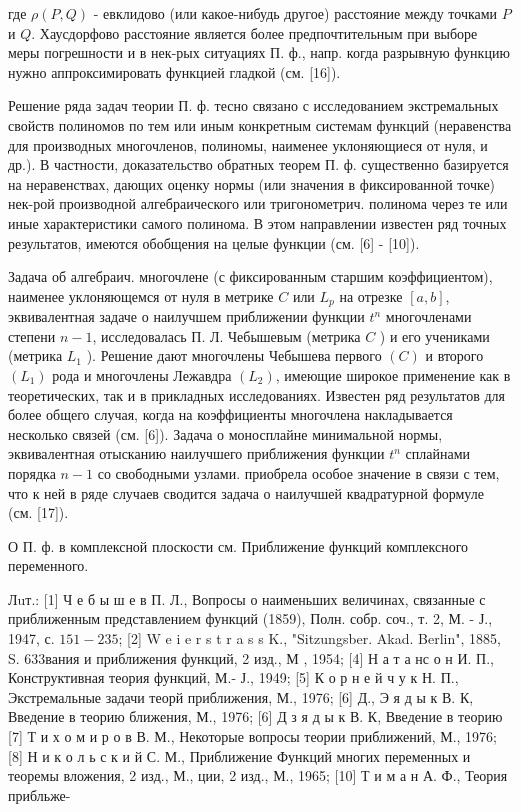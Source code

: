 \documentclass[10pt]{article}
\begin{document}
где $\rho(P, Q)$ - евклидово (или какое-нибудь другое) расстояние между точками $P$ и $Q$. Хаусдорфово расстояние является более предпочтительным при выборе меры погрешности и в нек-рых ситуациях П. ф., напр. когда разрывную функцию нужно аппроксимировать функцией гладкой (см. [16]).



Решение ряда задач теории П. ф. тесно связано с исследованием экстремальных свойств полиномов по тем или иным конкретным системам функций (неравенства для производных многочленов, полиномы, наименее уклоняющиеся от нуля, и др.). В частности, доказательство обратных теорем П. ф. существенно базируется на неравенствах, дающих оценку нормы (или значения в фиксированной точке) нек-рой производной алгебраического или тригонометрич. полинома через те или иные характеристики самого полинома. В этом направлении известен ряд точных результатов, имеются обобщения на целые функции (см. [6] - [10]).



Задача об алгебраич. многочлене (с фиксированным старшим коэффициентом), наименее уклоняющемся от нуля в метрике $C$ или $L_{p}$ на отрезке $[a, b]$, эквивалентная задаче о наилучшем приближении функции $t^{n}$ многочленами степени $n-1$, исследовалась П. Л. Чебышевым (метрика $C$ ) и его учениками (метрика $L_{1}$ ). Решение дают многочлены Чебышева первого $(C)$ и второго $\left(L_{1}\right)$ рода и многочлены Лежавдра $\left(L_{2}\right)$, имеющие широкое применение как в теоретических, так и в прикладных исследованиях. Известен ряд результатов для более общего случая, когда на коэффициенты многочлена накладывается несколько связей (см. [6]). Задача о моносплайне минимальной нормы, эквивалентная отысканию наилучшего приближения функции $t^{n}$ сплайнами порядка $n-1$ со свободными узлами. приобрела особое значение в связи с тем, что к ней в ряде случаев сводится задача о наилучшей квадратурной формуле (см. [17]).



О П. ф. в комплексной плоскости см. Приближение функций комплексного переменного.



Лuт.: [1] Ч е б ы ш е в П. Л., Вопросы о наименьших величинах, связанные с приближенным представлением функций (1859), Полн. собр. соч., т. 2, М. - Ј., 1947, с. $151-235$; [2] W e i e r s t r a s s K., "Sitzungsber. Akad. Berlin", 1885, S. 633вания и приближения функций, 2 изд., М , 1954; [4] Н а т а нс о н И. П., Конструктивная теория функций, М.- Ј., 1949; [5] К о р н е й ч у к Н. П., Экстремальные задачи теорй приближения, М., 1976; [6] Д., Э я д ы к В. К, Введение в теорию ближения, М., 1976; [6] Д з я д ы к В. К, Введение в теорию [7] Т и х о м и р о в В. М., Некоторые вопросы теории приближений, М., 1976; [8] Н и к о л ь с к и й С. М., Приближение Функций многих переменных и теоремы вложения, 2 изд., М., ции, 2 изд., М., 1965; [10] Т и м а н А. Ф., Теория прибльже-
\end{document}
